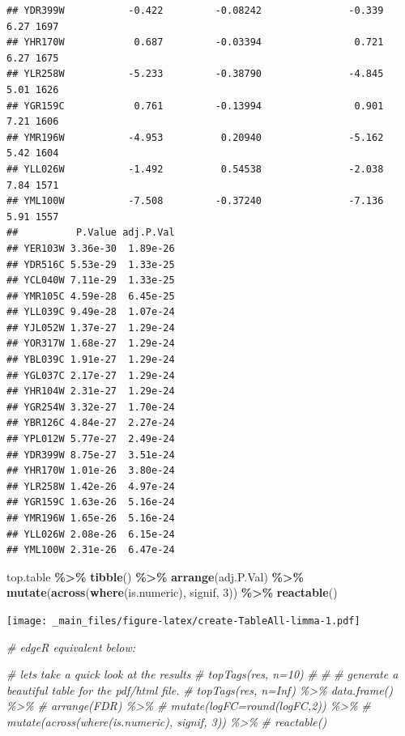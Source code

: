 \documentclass[
]{book}
\newenvironment{Shaded}{\begin{snugshade}}{\end{snugshade}}
\newcommand{\CommentTok}[1]{\textcolor[rgb]{0.56,0.35,0.01}{\textit{#1}}}
\newcommand{\DecValTok}[1]{\textcolor[rgb]{0.00,0.00,0.81}{#1}}
\newcommand{\FunctionTok}[1]{\textcolor[rgb]{0.13,0.29,0.53}{\textbf{#1}}}
\newcommand{\NormalTok}[1]{#1}
\newcommand{\SpecialCharTok}[1]{\textcolor[rgb]{0.81,0.36,0.00}{\textbf{#1}}}
\begin{document}
\begin{verbatim}
## YDR399W           -0.422         -0.08242               -0.339    6.27 1697
## YHR170W            0.687         -0.03394                0.721    6.27 1675
## YLR258W           -5.233         -0.38790               -4.845    5.01 1626
## YGR159C            0.761         -0.13994                0.901    7.21 1606
## YMR196W           -4.953          0.20940               -5.162    5.42 1604
## YLL026W           -1.492          0.54538               -2.038    7.84 1571
## YML100W           -7.508         -0.37240               -7.136    5.91 1557
##          P.Value adj.P.Val
## YER103W 3.36e-30  1.89e-26
## YDR516C 5.53e-29  1.33e-25
## YCL040W 7.11e-29  1.33e-25
## YMR105C 4.59e-28  6.45e-25
## YLL039C 9.49e-28  1.07e-24
## YJL052W 1.37e-27  1.29e-24
## YOR317W 1.68e-27  1.29e-24
## YBL039C 1.91e-27  1.29e-24
## YGL037C 2.17e-27  1.29e-24
## YHR104W 2.31e-27  1.29e-24
## YGR254W 3.32e-27  1.70e-24
## YBR126C 4.84e-27  2.27e-24
## YPL012W 5.77e-27  2.49e-24
## YDR399W 8.75e-27  3.51e-24
## YHR170W 1.01e-26  3.80e-24
## YLR258W 1.42e-26  4.97e-24
## YGR159C 1.63e-26  5.16e-24
## YMR196W 1.65e-26  5.16e-24
## YLL026W 2.08e-26  6.15e-24
## YML100W 2.31e-26  6.47e-24
\end{verbatim}

\begin{Shaded}
\begin{Highlighting}[]
\NormalTok{top.table }\SpecialCharTok{\%\textgreater{}\%} 
  \FunctionTok{tibble}\NormalTok{() }\SpecialCharTok{\%\textgreater{}\%} 
  \FunctionTok{arrange}\NormalTok{(adj.P.Val) }\SpecialCharTok{\%\textgreater{}\%}
  \FunctionTok{mutate}\NormalTok{(}\FunctionTok{across}\NormalTok{(}\FunctionTok{where}\NormalTok{(is.numeric), signif, }\DecValTok{3}\NormalTok{)) }\SpecialCharTok{\%\textgreater{}\%}
  \FunctionTok{reactable}\NormalTok{()}
\end{Highlighting}
\end{Shaded}

\texttt{[image: \_main\_files/figure-latex/create-TableAll-limma-1.pdf]}

\begin{Shaded}
\begin{Highlighting}[]
\CommentTok{\# edgeR equivalent below:}

\CommentTok{\# let\textquotesingle{}s take a quick look at the results}
\CommentTok{\# topTags(res, n=10) }
\CommentTok{\# }
\CommentTok{\# \# generate a beautiful table for the pdf/html file.}
\CommentTok{\# topTags(res, n=Inf) \%\textgreater{}\% data.frame() \%\textgreater{}\% }
\CommentTok{\#   arrange(FDR) \%\textgreater{}\%}
\CommentTok{\#   mutate(logFC=round(logFC,2)) \%\textgreater{}\%}
\CommentTok{\#   mutate(across(where(is.numeric), signif, 3)) \%\textgreater{}\%}
\CommentTok{\#   reactable()}
\end{Highlighting}
\end{Shaded}
\end{document}
